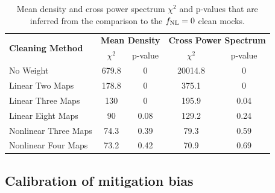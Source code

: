 \begin{table}
  \caption{Mean density and cross power spectrum $\chi^{2}$ and p-values that are inferred from the comparison to the $f_{\rm NL}=0$ clean mocks.}\label{tab:chi2test}
  \begin{tabular}{lcccc}
    \hline
    \hline
    \multirow{2}{*}{\textbf{Cleaning Method}} &
      \multicolumn{2}{c}{\textbf{Mean Density}} &
      \multicolumn{2}{c}{\textbf{Cross Power Spectrum}} \\
    & $\chi^{2}$ & p-value & $\chi^{2}$ & p-value \\
    \hline
   No Weight & 679.8 & 0 & 20014.8 & 0 \\
   Linear Two Maps & 178.8 & 0 & 375.1 & 0\\
   Linear Three Maps & 130 & 0 & 195.9 & 0.04\\
   Linear Eight Maps & 90 & 0.08 & 129.2 & 0.24\\
   Nonlinear Three Maps & 74.3 & 0.39  & 79.3 & 0.59\\
   Nonlinear Four Maps & 73.2 & 0.42 & 70.9 & 0.69\\    
    \hline
  \end{tabular}
\end{table}


\subsection{Calibration of mitigation bias}\label{ssec:calibration}

